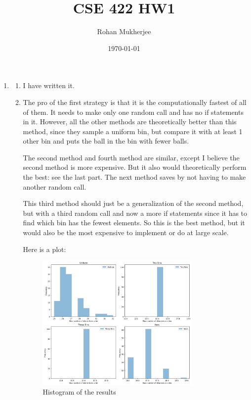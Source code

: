 \documentclass[12pt]{article}
\title{CSE 422 HW1}
\date{\today}
\author{Rohan Mukherjee}
\theoremstyle{definitionstyle}
\begin{document}
    \maketitle
    \begin{enumerate}[leftmargin=\labelsep]
        \item 
        \begin{enumerate}[label=(\alph*)]
            \item I have written it.

            \item The pro of the first strategy is that it is the computationally fastest of all of them. It needs to make only one random call and has no if statements in it. However, all the other methods are theoretically better than this method, since they sample a uniform bin, but compare it with at least 1 other bin and puts the ball in the bin with fewer balls. 
            
            The second method and fourth method are similar, except I believe the second method is more expensive. But it also would theoretically perform the best: see the last part. The next method saves by not having to make another random call.

            This third method should just be a generalization of the second method, but with a third random call and now a more if statements since it has to find which bin has the fewest elements. So this is the best method, but it would also be the most expensive to implement or do at large scale.

            Here is a plot:
            \begin{figure}[H]
                \centering
                \includegraphics[width=0.8\textwidth]{histogram.png}
                \caption{Histogram of the results}
                \label{fig:histogram}
            \end{figure}



\end{enumerate}
\end{enumerate}
\end{document}
